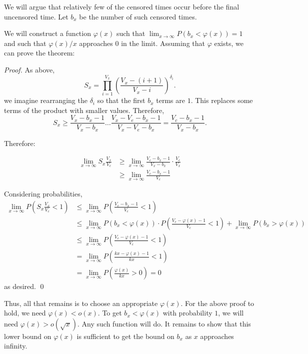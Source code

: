 \documentclass[11pt]{article}
\theoremstyle{definition}
\begin{document}
We will argue that relatively few of the censored times occur before the final uncensored time.  
Let $b_x$ be the number of such censored times.

We will construct a function $\varphi(x)$ such that $\lim_{x\rightarrow \infty}P(b_x < \varphi(x))=1$  and such that
$\varphi(x)/x$ approaches $0$ in the limit.  Assuming that $\varphi$ exists, we can prove the theorem:

\begin{proof}
    As above,
    \[S_x = \prod_{i=1}^{V_x} \left(\frac{V_x-(i+1)}{V_x-i}\right)^{\delta_i}.\]
    we imagine rearranging the $\delta_i$ so that the first $b_x$ terms are $1$.  This replaces some
    terms of the product with smaller values.  Therefore,
    \[S_x \ge \frac{V_x-b_x-1}{V_x-b_x}\dots \frac{V_x-V_e-b_x-1}{V_x-V_e-b_x} = \frac{V_c-b_x-1}{V_x-b_x}.\]

    Therefore:

    \begin{align}
        \lim_{x\rightarrow \infty}S_x\frac{V_x}{V_c} &\geq \lim_{x\rightarrow \infty} \frac{V_c-b_x-1}{V_x-b_x} \cdot \frac{V_c}{V_x} \\
        &\geq \lim_{x\rightarrow \infty}\frac{V_c-b_x-1}{V_c} 
    \end{align}

    Considering probabilities,
    \begin{align}    
        \lim_{x\rightarrow \infty}P\left(S_x\frac{V_x}{V_c}<1\right) &\leq  \lim_{x\rightarrow \infty}P\left(\frac{V_c-b_x-1}{V_c}<1\right) \\
        &\leq \lim_{x\rightarrow \infty}P(b_x < \varphi(x))\cdot P\left(\frac{V_c-\varphi(x)-1}{V_c}<1\right) +  \lim_{x\rightarrow \infty}P(b_x > \varphi(x)) \\
        &\leq \lim_{x\rightarrow \infty}P\left(\frac{V_c-\varphi(x)-1}{V_c}<1\right) \\
        &= \lim_{x\rightarrow \infty}P\left(\frac{kx-\varphi(x)-1}{kx}<1\right)  \\
        &= \lim_{x\rightarrow \infty} P\left(\frac{\varphi(x)}{kx}>0\right)= 0
    \end{align}
    as desired. \qed
\end{proof}

Thus, all that remains is to choose an appropriate $\varphi(x)$.  For the above proof to hold, we need
$\varphi(x) < o(x)$.  To get $b_x < \varphi(x)$ with probability $1$, we will need $\varphi(x) > o(\sqrt{x})$. 
Any such function will do.  It remains to show that this lower bound on $\varphi(x)$ is sufficient to get the
bound on $b_x$ as $x$ approaches infinity.
\end{document}
